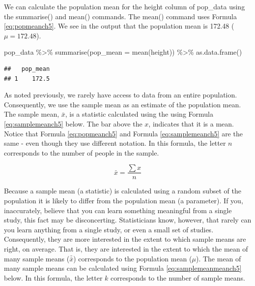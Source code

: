 \documentclass[
]{krantz}
\makeatletter
\newenvironment{Shaded}{\begin{snugshade}}{\end{snugshade}}
\newcommand{\AttributeTok}[1]{\textcolor[rgb]{0.61,0.61,0.61}{#1}}
\newcommand{\FunctionTok}[1]{\textcolor[rgb]{0,0,0}{#1}}
\newcommand{\NormalTok}[1]{#1}
\newcommand{\SpecialCharTok}[1]{\textcolor[rgb]{0,0,0}{#1}}
\newenvironment{kframe}{%
\medskip{}
\setlength{\fboxsep}{.8em}
 \def\at@end@of@kframe{}%
 \ifinner\ifhmode%
  \def\at@end@of@kframe{\end{minipage}}%
  \begin{minipage}{\columnwidth}%
 \fi\fi%
 \def\FrameCommand##1{\hskip\@totalleftmargin \hskip-\fboxsep
 \colorbox{shadecolor}{##1}\hskip-\fboxsep
     \hskip-\linewidth \hskip-\@totalleftmargin \hskip\columnwidth}%
 \MakeFramed {\advance\hsize-\width
   \@totalleftmargin\z@ \linewidth\hsize
   \@setminipage}}%
 {\par\unskip\endMakeFramed%
 \at@end@of@kframe}
\renewenvironment{Shaded}{\begin{kframe}}{\end{kframe}}
\makeatother
\begin{document}
We can calculate the population mean for the height column of pop\_data using the summarise() and mean() commands. The mean() command uses Formula \eqref{eq:popmeanch5}. We see in the output that the population mean is 172.48 (\(\mu = 172.48\)).

\begin{Shaded}
\begin{Highlighting}[]
\NormalTok{pop\_data }\SpecialCharTok{\%\textgreater{}\%}
  \FunctionTok{summarise}\NormalTok{(}\AttributeTok{pop\_mean =} \FunctionTok{mean}\NormalTok{(height)) }\SpecialCharTok{\%\textgreater{}\%}
  \FunctionTok{as.data.frame}\NormalTok{()}
\end{Highlighting}
\end{Shaded}

\begin{verbatim}
##   pop_mean
## 1    172.5
\end{verbatim}

As noted previously, we rarely have access to data from an entire population. Consequently, we use the sample mean as an estimate of the population mean. The sample mean, \(\bar{x}\), is a statistic calculated using the using Formula \eqref{eq:samplemeanch5} below. The bar above the \(x\), indicates that it is a mean. Notice that Formula \eqref{eq:popmeanch5} and Formula \eqref{eq:samplemeanch5} are the same - even though they use different notation. In this formula, the letter \(n\) corresponds to the number of people in the sample.

\begin{equation} 
\bar{x} = \frac{\sum{x}}{n}
      \label{eq:samplemeanch5}
\end{equation}

Because a sample mean (a statistic) is calculated using a random subset of the population it is likely to differ from the population mean (a parameter). If you, inaccurately, believe that you can learn something meaningful from a single study, this fact may be disconcerting. Statisticians know, however, that rarely can you learn anything from a single study, or even a small set of studies. Consequently, they are more interested in the extent to which sample means are right, on average. That is, they are interested in the extent to which the mean of many sample means (\(\bar{\bar{x}}\)) corresponds to the population mean (\(\mu\)). The mean of many sample means can be calculated using Formula \eqref{eq:samplemeanmeanch5} below. In this formula, the letter \(k\) corresponds to the number of sample means.
\end{document}
